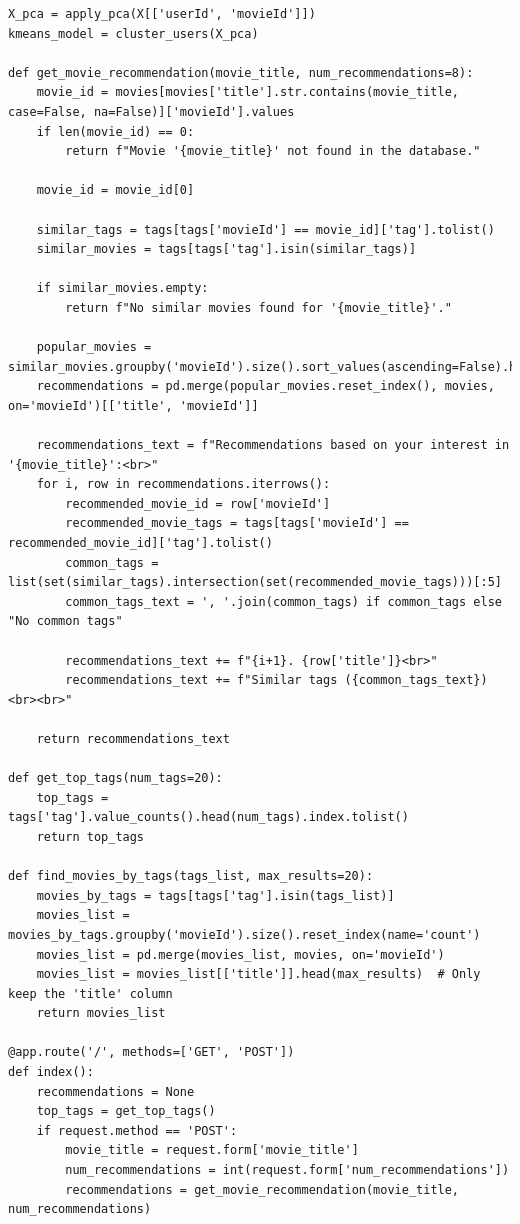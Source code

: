 \documentclass[conference]{IEEEtran}
\begin{document}
\begin{lstlisting}
X_pca = apply_pca(X[['userId', 'movieId']])
kmeans_model = cluster_users(X_pca)

def get_movie_recommendation(movie_title, num_recommendations=8):
    movie_id = movies[movies['title'].str.contains(movie_title, case=False, na=False)]['movieId'].values
    if len(movie_id) == 0:
        return f"Movie '{movie_title}' not found in the database."
    
    movie_id = movie_id[0]
    
    similar_tags = tags[tags['movieId'] == movie_id]['tag'].tolist()
    similar_movies = tags[tags['tag'].isin(similar_tags)]
    
    if similar_movies.empty:
        return f"No similar movies found for '{movie_title}'."
    
    popular_movies = similar_movies.groupby('movieId').size().sort_values(ascending=False).head(num_recommendations)
    recommendations = pd.merge(popular_movies.reset_index(), movies, on='movieId')[['title', 'movieId']]
    
    recommendations_text = f"Recommendations based on your interest in '{movie_title}':<br>"
    for i, row in recommendations.iterrows():
        recommended_movie_id = row['movieId']
        recommended_movie_tags = tags[tags['movieId'] == recommended_movie_id]['tag'].tolist()
        common_tags = list(set(similar_tags).intersection(set(recommended_movie_tags)))[:5]
        common_tags_text = ', '.join(common_tags) if common_tags else "No common tags"
        
        recommendations_text += f"{i+1}. {row['title']}<br>"
        recommendations_text += f"Similar tags ({common_tags_text})<br><br>"
    
    return recommendations_text

def get_top_tags(num_tags=20):
    top_tags = tags['tag'].value_counts().head(num_tags).index.tolist()
    return top_tags

def find_movies_by_tags(tags_list, max_results=20):
    movies_by_tags = tags[tags['tag'].isin(tags_list)]
    movies_list = movies_by_tags.groupby('movieId').size().reset_index(name='count')
    movies_list = pd.merge(movies_list, movies, on='movieId')
    movies_list = movies_list[['title']].head(max_results)  # Only keep the 'title' column
    return movies_list

@app.route('/', methods=['GET', 'POST'])
def index():
    recommendations = None
    top_tags = get_top_tags()
    if request.method == 'POST':
        movie_title = request.form['movie_title']
        num_recommendations = int(request.form['num_recommendations'])
        recommendations = get_movie_recommendation(movie_title, num_recommendations)
        

\end{lstlisting}
\end{document}
